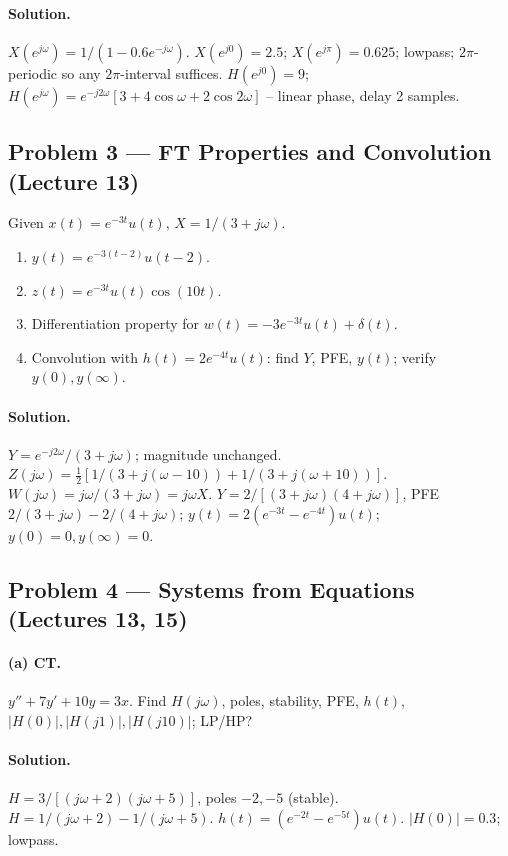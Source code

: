 \documentclass[11pt]{article}
\begin{document}
\paragraph{Solution.} $X(e^{j\omega}) = 1/(1-0.6 e^{-j\omega})$. $X(e^{j0})=2.5$; $X(e^{j\pi})=0.625$; lowpass; $2\pi$-periodic so any $2\pi$-interval suffices. $H(e^{j0}) = 9$; $H(e^{j\omega}) = e^{-j2\omega}[3+4\cos\omega+2\cos 2\omega]$ -- linear phase, delay 2 samples.

\subsection{Problem 3 --- FT Properties and Convolution (Lecture 13)}
Given $x(t) = e^{-3t}u(t)$, $X = 1/(3+j\omega)$.
\begin{enumerate}[label=(\alph*)]
  \item $y(t) = e^{-3(t-2)}u(t-2)$.
  \item $z(t) = e^{-3t}u(t)\cos(10t)$.
  \item Differentiation property for $w(t) = -3e^{-3t}u(t)+\delta(t)$.
  \item Convolution with $h(t)=2e^{-4t}u(t)$: find $Y$, PFE, $y(t)$; verify $y(0), y(\infty)$.
\end{enumerate}

\paragraph{Solution.} $Y = e^{-j2\omega}/(3+j\omega)$; magnitude unchanged. $Z(j\omega) = \tfrac{1}{2}[1/(3+j(\omega-10)) + 1/(3+j(\omega+10))]$. $W(j\omega)=j\omega/(3+j\omega)=j\omega X$. $Y = 2/[(3+j\omega)(4+j\omega)]$, PFE $2/(3+j\omega) - 2/(4+j\omega)$; $y(t)=2(e^{-3t}-e^{-4t})u(t)$; $y(0)=0,y(\infty)=0$.

\subsection{Problem 4 --- Systems from Equations (Lectures 13, 15)}
\paragraph{(a) CT.} $y''+7y'+10y = 3x$. Find $H(j\omega)$, poles, stability, PFE, $h(t)$, $|H(0)|, |H(j1)|, |H(j10)|$; LP/HP?

\paragraph{Solution.} $H = 3/[(j\omega+2)(j\omega+5)]$, poles $-2,-5$ (stable). $H = 1/(j\omega+2) - 1/(j\omega+5)$. $h(t)=(e^{-2t}-e^{-5t})u(t)$. $|H(0)| = 0.3$; lowpass.
\end{document}
